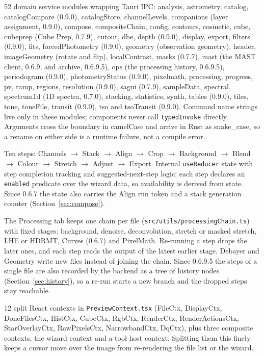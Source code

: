 \documentclass[11pt,a4paper]{article}
\newcommand{\code}[1]{\texttt{\small #1}}
\newcommand{\nServices}{52}
\begin{document}
    \begin{description}[style=nextline, leftmargin=2cm]
    \item[\texttt{services/}] \nServices{} domain service modules wrapping Tauri IPC: analysis, astrometry, catalog, catalogCompare (0.9.0), catalogStore, channelLevels, companions (layer assignment, 0.9.0), compose, compositeChain, config, contours, cosmetic, cube, cubeprep (Cube Prep, 0.7.9), cutout, dbe, depth (0.9.0), display, export, filters (0.9.0), fits, forcedPhotometry (0.9.0), geometry (observation geometry), header, imageGeometry (rotate and flip), localContrast, masks (0.7.7), mast (the MAST client, 0.6.9, and archive, 0.6.9.5), ops (the processing history, 0.6.9.5), periodogram (0.9.0), photometryStatus (0.9.0), pixelmath, processing, progress, pv, ramp, regions, resolution (0.9.0), sagui (0.7.9), sampleData, spectral, spectrum1d (1D spectra, 0.7.0), stacking, statistics, synth, tables (0.9.0), tiles, tone, toneFile, transit (0.9.0), tso and tsoTransit (0.9.0). Command name strings live only in these modules; components never call \code{typedInvoke} directly. Arguments cross the boundary in camelCase and arrive in Rust as snake\_case, so a rename on either side is a runtime failure, not a compile error.
    \item[\texttt{ComposeWizard}] Ten steps: Channels $\to$ Stack $\to$ Align $\to$ Crop $\to$ Background $\to$ Blend $\to$ Colour $\to$ Stretch $\to$ Adjust $\to$ Export. Internal \code{useReducer} state with step completion tracking and suggested-next-step logic; each step declares an \code{enabled} predicate over the wizard data, so availability is derived from state. Since 0.6.7 the state also carries the Align run token and a stack generation counter (Section~\ref{sec:compose}).
    \item[Processing chain] The Processing tab keeps one chain per file (\code{src/utils/processingChain.ts}) with fixed stages: background, denoise, deconvolution, stretch or masked stretch, LHE or HDRMT, Curves (0.6.7) and PixelMath. Re-running a step drops the later ones, and each step reads the output of the latest earlier stage. Debayer and Geometry write new files instead of joining the chain. Since 0.6.9.5 the steps of a single file are also recorded by the backend as a tree of history nodes (Section~\ref{sec:history}), so a re-run starts a new branch and the dropped steps stay reachable.
    \item[Preview Contexts] 12 split React contexts in \code{PreviewContext.tsx} (FileCtx, DisplayCtx, DoneFilesCtx, HistCtx, CubeCtx, RgbCtx, RenderCtx, RenderActionsCtx, StarOverlayCtx, RawPixelsCtx, NarrowbandCtx, DqCtx), plus three composite contexts, the wizard context and a tool-host context. Splitting them this finely keeps a cursor move over the image from re-rendering the file list or the wizard.

\end{description}
\end{document}
